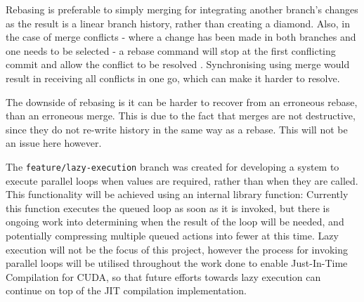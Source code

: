 \par
Rebasing is preferable to simply merging for integrating another branch's changes as the result is a linear branch history, rather than creating a diamond. Also, in the case of merge conflicts - where a change has been made in both branches and one needs to be selected - a rebase command will stop at the first conflicting commit and allow the conflict to be resolved \cite{rebase-doc}. Synchronising using merge would result in receiving all conflicts in one go, which can make it harder to resolve.
\par
The downside of rebasing is it can be harder to recover from an erroneous rebase, than an erroneous merge. This is due to the fact that merges are not destructive, since they do not re-write history in the same way as a rebase. This will not be an issue here however.
\par
The \verb|feature/lazy-execution| branch was created for developing a system to execute parallel loops when values are required, rather than when they are called. This functionality will be achieved using an internal library function:
Currently this function executes the queued loop as soon as it is invoked, but there is ongoing work into determining when the result of the loop will be needed, and potentially compressing multiple queued actions into fewer at this time. Lazy execution will not be the focus of this project, however the process for invoking parallel loops will be utilised throughout the work done to enable Just-In-Time Compilation for CUDA, so that future efforts towards lazy execution can continue on top of the JIT compilation implementation.


